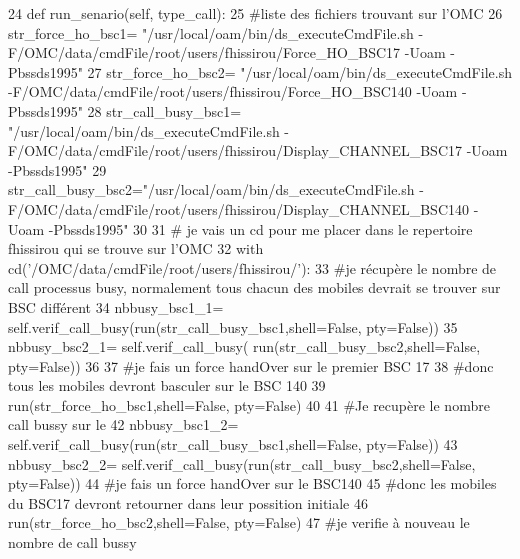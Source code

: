 \begin{DoxyCode}
24     \textcolor{keyword}{def }run\_senario(self, type\_call):
25         \textcolor{comment}{#liste des fichiers trouvant sur l'OMC
}
26         str\_force\_ho\_bsc1= \textcolor{stringliteral}{"/usr/local/oam/bin/ds\_executeCmdFile.sh
       -F/OMC/data/cmdFile/root/users/fhissirou/Force\_HO\_BSC17 -Uoam -Pbssds1995"}
27         str\_force\_ho\_bsc2= \textcolor{stringliteral}{"/usr/local/oam/bin/ds\_executeCmdFile.sh
       -F/OMC/data/cmdFile/root/users/fhissirou/Force\_HO\_BSC140 -Uoam -Pbssds1995"}
28         str\_call\_busy\_bsc1= \textcolor{stringliteral}{"/usr/local/oam/bin/ds\_executeCmdFile.sh
       -F/OMC/data/cmdFile/root/users/fhissirou/Display\_CHANNEL\_BSC17 -Uoam -Pbssds1995"}
29         str\_call\_busy\_bsc2=\textcolor{stringliteral}{"/usr/local/oam/bin/ds\_executeCmdFile.sh
       -F/OMC/data/cmdFile/root/users/fhissirou/Display\_CHANNEL\_BSC140 -Uoam -Pbssds1995"}
30         
31         \textcolor{comment}{# je vais un cd pour me placer dans le repertoire fhissirou qui se trouve sur l'OMC
}
32         with cd(\textcolor{stringliteral}{'/OMC/data/cmdFile/root/users/fhissirou/'}):
33             \textcolor{comment}{#je récupère le nombre de call processus busy, normalement tous chacun des mobiles devrait se
       trouver sur BSC différent
}
34             nbbusy\_bsc1\_1= self.verif\_call\_busy(run(str\_call\_busy\_bsc1,shell=\textcolor{keyword}{False}, pty=\textcolor{keyword}{False}))
35             nbbusy\_bsc2\_1= self.verif\_call\_busy( run(str\_call\_busy\_bsc2,shell=\textcolor{keyword}{False}, pty=\textcolor{keyword}{False}))
36 
37             \textcolor{comment}{#je fais un force handOver sur le premier BSC 17
}
38             \textcolor{comment}{#donc tous les mobiles devront basculer sur le BSC 140
}
39             run(str\_force\_ho\_bsc1,shell=\textcolor{keyword}{False}, pty=\textcolor{keyword}{False})
40 
41             \textcolor{comment}{#Je recupère le nombre call bussy sur le 
}
42             nbbusy\_bsc1\_2= self.verif\_call\_busy(run(str\_call\_busy\_bsc1,shell=\textcolor{keyword}{False}, pty=\textcolor{keyword}{False}))
43             nbbusy\_bsc2\_2= self.verif\_call\_busy(run(str\_call\_busy\_bsc2,shell=\textcolor{keyword}{False}, pty=\textcolor{keyword}{False}))
44             \textcolor{comment}{#je fais un force handOver sur le BSC140
}
45             \textcolor{comment}{#donc les mobiles du BSC17 devront retourner dans leur possition initiale 
}
46             run(str\_force\_ho\_bsc2,shell=\textcolor{keyword}{False}, pty=\textcolor{keyword}{False})
47             \textcolor{comment}{#je verifie à nouveau le nombre de call bussy
}
\end{DoxyCode}
